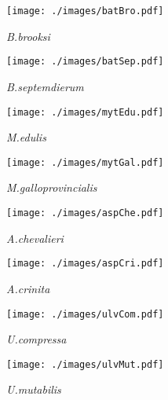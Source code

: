 \documentclass{article}
\begin{document}
\begin{figure}[h!]
    \centering
    \begin{subfigure}{0.32\textwidth}
      \centering
      \texttt{[image: ./images/batBro.pdf]}
      \caption{\textit{B.brooksi}}
      \label{fig:fig1a}
    \end{subfigure}
    \hfill
    \begin{subfigure}{0.32\textwidth}
      \centering
      \texttt{[image: ./images/batSep.pdf]}
      \caption{\textit{B.septemdierum}}
      \label{fig:fig1b}
    \end{subfigure}
    \hfill
    \begin{subfigure}{0.32\textwidth}
      \centering
      \texttt{[image: ./images/mytEdu.pdf]}
      \caption{\textit{M.edulis}}
      \label{fig:fig1c}
    \end{subfigure}
    \vspace{0.05cm}
    \begin{subfigure}{0.32\textwidth}
      \centering
      \texttt{[image: ./images/mytGal.pdf]}
      \caption{\textit{M.galloprovincialis}}
      \label{fig:fig1d}
    \end{subfigure}
    \hfill
    \begin{subfigure}{0.32\textwidth}
        \centering
        \texttt{[image: ./images/aspChe.pdf]}
        \caption{\textit{A.chevalieri}}
        \label{fig:fig1e}
    \end{subfigure}
    \hfill
    \begin{subfigure}{0.32\textwidth}
        \centering
        \texttt{[image: ./images/aspCri.pdf]}
        \caption{\textit{A.crinita}}
        \label{fig:fig1f}
    \end{subfigure}
    \vspace{0.05cm}
    \begin{subfigure}{0.32\textwidth}
      \centering
      \texttt{[image: ./images/ulvCom.pdf]}
      \caption{\textit{U.compressa}}
      \label{fig:fig1g}
    \end{subfigure}
    \hfill
    \begin{subfigure}{0.32\textwidth}
      \centering
      \texttt{[image: ./images/ulvMut.pdf]}
      \caption{\textit{U.mutabilis}}
      \label{fig:fig1h}
    \end{subfigure}
    \hfill
    \begin{subfigure}{0.32\textwidth}
      \centering

\end{subfigure}
\end{figure}
\end{document}
